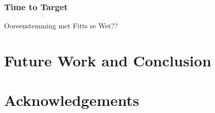 \documentclass[format=sigconf, review=true, screen=true, anonymous=true]{acmart}
\begin{document}



\subsubsection{Time to Target}
 Ooreenstemming met Fitts se Wet?? 

\section{Future Work and Conclusion}

\section{Acknowledgements}



\end{document}
